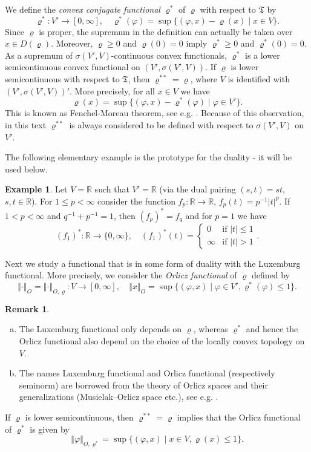 \documentclass[a4paper,11pt,reqno]{amsart}
\theoremstyle{definition}
\newtheorem{example}[lemma]{Example}
\newtheorem{remark}[lemma]{Remark}
\numberwithin{equation}{section}
\newcommand{\R}{{\mathbb R}}
\newcommand{\vr}{{\varrho}}
\newcommand{\av}[1]{\left\Vert #1\right\Vert}
\newcommand{\1}{\mathds{1}}
\begin{document}
We define the {\em convex conjugate functional} $\vr^*$ of $\vr$  with respect to $\mathfrak{T}$ by
%
$$\vr^* \colon V' \to [0,\infty], \quad \vr^*(\varphi) = \sup \{(\varphi,x) - \vr(x) \mid x \in V\}.$$
%
Since $\vr$ is proper, the supremum in the definition can actually be taken over $x \in D(\vr)$. Moreover, $\vr \geq 0$ and $\vr(0) = 0$ imply $\vr^* \geq 0$ and $\vr^*(0) = 0$. As a supremum of $\sigma(V',V)$-continuous convex functionals, $\vr^*$ is a lower semicontinuous convex functional on $(V',\sigma(V',V))$.  If  $\vr$ is lower semicontinuous with respect to $\mathfrak{T}$, then $\vr^{**} = \vr$, where $V$ is identified with $(V',\sigma(V',V))'$. More precisely, for all $x \in  V$ we have
%
$$ \vr(x) = \sup \{(\varphi,x) - \vr^*(\varphi) \mid \varphi \in V'\}.$$
%
This is known as Fenchel-Moreau theorem, see e.g. \cite[Theorem 2.3.3]{Zua02}.  Because of this observation, in this text $\vr^{**}$ is always considered to be defined with respect to $\sigma(V',V)$ on $V'$. 


The following elementary example is the prototype for the duality - it will be used below. 


\begin{example}\label{example:basic duality}
 Let $V = \R$ such that $V' = \R$  (via the dual pairing $(s,t) = st$, $s,t \in \R$). For $1 \leq p < \infty$ consider the function $f_p\colon \R \to \R$, $f_p(t) = p^{-1} |t|^p$.  If $1 < p < \infty$ and $q^{-1} + p^{-1} = 1$, then $(f_p)^* = f_q$ and for $p = 1$ we have
 $$(f_1)^* \colon \R \to \{0,\infty\}, \quad (f_1)^*(t) = \begin{cases}
                 0 &\text{if }|t| \leq 1\\
                 \infty &\text{if } |t| > 1
                \end{cases}.
$$
\end{example}

Next we study a functional that is in some form of duality with the Luxemburg functional. More precisely, we consider the {\em Orlicz functional}  of $\vr$ defined by 
%
$$\av{\cdot}_O = \av{\cdot}_{O,\vr} \colon V \to [0,\infty],\quad \av{x}_O = \sup\{(\varphi,x) \mid \varphi \in V',  \vr^*(\varphi) \leq 1\}.$$
%

%



\begin{remark}
 \begin{enumerate}[(a)]
  \item The Luxemburg functional only depends on $\vr$, whereas $\vr^*$ and hence the Orlicz functional also depend on the choice of the locally convex topology on $V$.
  \item The names Luxemburg functional and Orlicz functional (respectively seminorm) are borrowed from the theory of Orlicz spaces and their generalizations (Musielak–Orlicz space etc.), see e.g. \cite{DHHR11}.  
 \end{enumerate}

 
 
\end{remark}
%
If $\vr$ is lower semicontinuous, then $\vr^{**} = \vr$  implies that the Orlicz functional of $\vr^*$ is given by
%
$$\av{\varphi}_{O,\vr^*} = \sup\{(\varphi,x) \mid x \in V, \vr(x) \leq 1\}.$$
%
\end{document}
